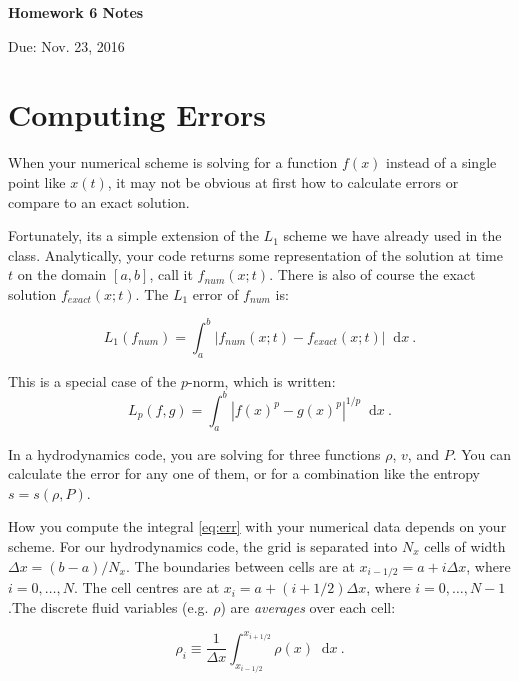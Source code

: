 \documentclass{article}
\newcommand*\diff{\mathop{}\!\mathrm{d}}
\begin{document}
\begin{center}

\vspace*{-2.5cm}
\LARGE
\bf{Homework 6 Notes}
\vspace{1cm}

\large{Due: Nov. 23, 2016}
\vspace{1cm}

\end{center}

\section{Computing Errors}

When your numerical scheme is solving for a function $f(x)$ instead of a single point like $x(t)$, it may not be obvious at first how to calculate errors or compare to an exact solution.

Fortunately, its a simple extension of the $L_1$ scheme we have already used in the class.  Analytically, your code returns some representation of the solution at time $t$ on the domain $[a,b]$, call it $f_{num}(x;t)$.  There is also of course the exact solution $f_{exact}(x;t)$.  The $L_1$ error of $f_{num}$ is:

\begin{equation}
	L_1(f_{num}) = \int_a^b \left | f_{num}(x;t) - f_{exact}(x;t) \right | \diff x \ . \label{eq:err}
\end{equation}

This is a special case of the $p$-norm, which is written:
\begin{equation}
	L_p(f,g) = \int_a^b \left | f(x)^p - g(x)^p \right |^{1/p} \diff x \ .
\end{equation}

In a hydrodynamics code, you are solving for three functions $\rho$, $v$, and $P$. You can calculate the error for any one of them, or for a combination like the entropy $s = s(\rho, P)$.  

How you compute the integral \eqref{eq:err} with your numerical data depends on your scheme.  For our hydrodynamics code, the grid is separated into $N_x$ cells of width $\Delta x = (b-a) / N_x$. The boundaries between cells are at $x_{i-1/2} = a+ i \Delta x$, where $i=0,\dots,N$.  The cell centres are at $x_i = a+ (i+1/2) \Delta x$, where $i=0, \dots, N-1$.The discrete fluid variables (e.g. $\rho$) are \emph{averages} over each cell:

\begin{equation}
	\rho_i \equiv \frac{1}{\Delta x}\int_{x_{i-1/2}}^{x_{i+1/2}} \rho(x) \diff x  \ .
\end{equation}
\end{document}
